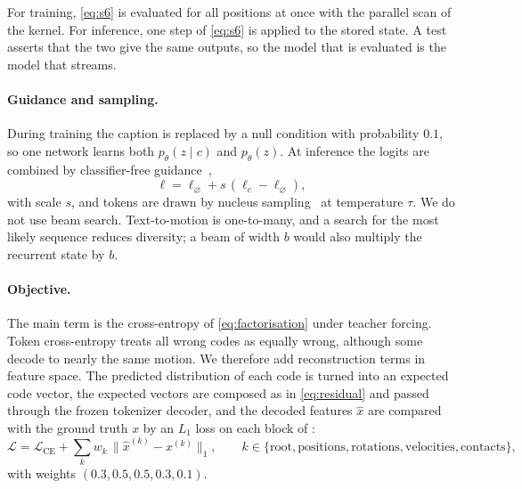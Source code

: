 For training, \eqref{eq:s6} is evaluated for all positions at once with the parallel scan of the kernel. For inference, one step of \eqref{eq:s6} is applied to the stored state. A test asserts that the two give the same outputs, so the model that is evaluated is the model that streams.

\paragraph{Guidance and sampling.} During training the caption is replaced by a null condition with probability $0.1$, so one network learns both $p_\theta(z \mid c)$ and $p_\theta(z)$. At inference the logits are combined by classifier-free guidance~\cite{ho2022cfg},
\begin{equation}
\ell = \ell_{\varnothing} + s\,(\ell_{c} - \ell_{\varnothing}),
\label{eq:cfg}
\end{equation}
with scale $s$, and tokens are drawn by nucleus sampling~\cite{holtzman2020nucleus} at temperature $\tau$. We do not use beam search. Text-to-motion is one-to-many, and a search for the most likely sequence reduces diversity; a beam of width $b$ would also multiply the recurrent state by $b$.

\paragraph{Objective.} The main term is the cross-entropy of \eqref{eq:factorisation} under teacher forcing. Token cross-entropy treats all wrong codes as equally wrong, although some decode to nearly the same motion. We therefore add reconstruction terms in feature space. The predicted distribution of each code is turned into an expected code vector, the expected vectors are composed as in \eqref{eq:residual} and passed through the frozen tokenizer decoder, and the decoded features $\hat{x}$ are compared with the ground truth $x$ by an $L_1$ loss on each block of :
\begin{equation}
\mathcal{L} = \mathcal{L}_{\mathrm{CE}} + \sum_{k} w_k \,\bigl\lVert \hat{x}^{(k)} - x^{(k)} \bigr\rVert_1 , \qquad k \in \{\text{root}, \text{positions}, \text{rotations}, \text{velocities}, \text{contacts}\},
\label{eq:loss}
\end{equation}
with weights $(0.3, 0.5, 0.5, 0.3, 0.1)$.

